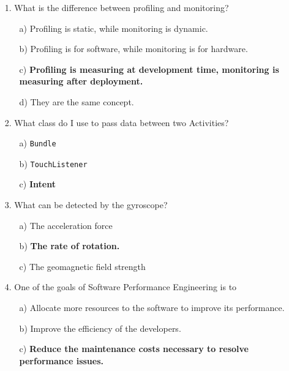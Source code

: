 \documentclass[12pt]{book}
\begin{document}
\begin{itemize}
    \item[1.] What is the difference between profiling and monitoring?
    \begin{itemize}
        \item[a)] Profiling is static, while monitoring is dynamic.
        \item[b)] Profiling is for software, while monitoring is for hardware.
        \item[c)] \textbf{Profiling is measuring at development time, monitoring is measuring after deployment.}
        \item[d)] They are the same concept.
    \end{itemize}

    \item[2.] What class do I use to pass data between two Activities?
    \begin{itemize}
        \item[a)] \texttt{Bundle}
        \item[b)] \texttt{TouchListener}
        \item[c)] \textbf{Intent}
    \end{itemize}

    \item[3.] What can be detected by the gyroscope?
    \begin{itemize}
        \item[a)] The acceleration force
        \item[b)] \textbf{The rate of rotation.}
        \item[c)] The geomagnetic field strength
    \end{itemize}

    \item[4.] One of the goals of Software Performance Engineering is to
    \begin{itemize}
        \item[a)] Allocate more resources to the software to improve its performance.
        \item[b)] Improve the efficiency of the developers.
        \item[c)] \textbf{Reduce the maintenance costs necessary to resolve performance issues.}
    \end{itemize}


\end{itemize}
\end{document}
